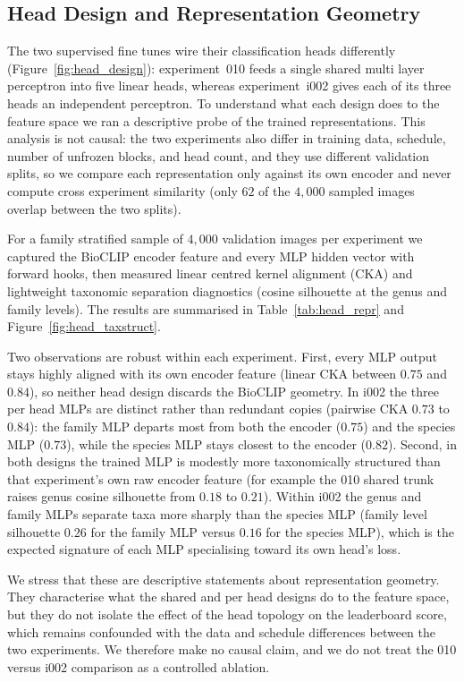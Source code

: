 \subsection{Head Design and Representation Geometry}
\label{sec:head_repr}

The two supervised fine tunes wire their classification heads differently
(Figure~\ref{fig:head_design}): experiment~010 feeds a single shared multi layer perceptron into
five linear heads, whereas experiment~i002 gives each of its three heads an independent
perceptron. To understand what each design does to the feature space we ran a descriptive probe
of the trained representations. This analysis is not causal: the two experiments also differ in
training data, schedule, number of unfrozen blocks, and head count, and they use different
validation splits, so we compare each representation only against its own encoder and never
compute cross experiment similarity (only $62$ of the $4{,}000$ sampled images overlap between
the two splits).

For a family stratified sample of $4{,}000$ validation images per experiment we captured the
BioCLIP encoder feature and every MLP hidden vector with forward hooks, then measured linear
centred kernel alignment (CKA) and lightweight taxonomic separation diagnostics (cosine
silhouette at the genus and family levels). The results are summarised in
Table~\ref{tab:head_repr} and Figure~\ref{fig:head_taxstruct}.

Two observations are robust within each experiment. First, every MLP output stays highly aligned
with its own encoder feature (linear CKA between $0.75$ and $0.84$), so neither head design
discards the BioCLIP geometry. In i002 the three per head MLPs are distinct rather than redundant
copies (pairwise CKA $0.73$ to $0.84$): the family MLP departs most from both the encoder
($0.75$) and the species MLP ($0.73$), while the species MLP stays closest to the encoder
($0.82$). Second, in both designs the trained MLP is modestly more taxonomically structured than
that experiment's own raw encoder feature (for example the 010 shared trunk raises genus cosine
silhouette from $0.18$ to $0.21$). Within i002 the genus and family MLPs separate taxa more
sharply than the species MLP (family level silhouette $0.26$ for the family MLP versus $0.16$ for
the species MLP), which is the expected signature of each MLP specialising toward its own head's
loss.

We stress that these are descriptive statements about representation geometry. They characterise
what the shared and per head designs do to the feature space, but they do not isolate the effect
of the head topology on the leaderboard score, which remains confounded with the data and
schedule differences between the two experiments. We therefore make no causal claim, and we do
not treat the 010 versus i002 comparison as a controlled ablation.

